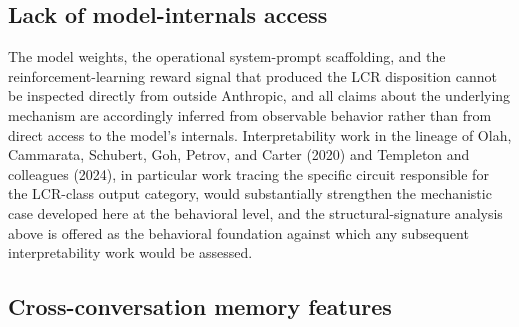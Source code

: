 \documentclass[11pt]{article}
\begin{document}
\subsection{Lack of model-internals access}

The model weights, the operational system-prompt scaffolding, and the reinforcement-learning reward signal that produced the LCR disposition cannot be inspected directly from outside Anthropic, and all claims about the underlying mechanism are accordingly inferred from observable behavior rather than from direct access to the model's internals. Interpretability work in the lineage of Olah, Cammarata, Schubert, Goh, Petrov, and Carter (2020) and Templeton and colleagues (2024), in particular work tracing the specific circuit responsible for the LCR-class output category, would substantially strengthen the mechanistic case developed here at the behavioral level, and the structural-signature analysis above is offered as the behavioral foundation against which any subsequent interpretability work would be assessed.

\subsection{Cross-conversation memory features}
\end{document}
